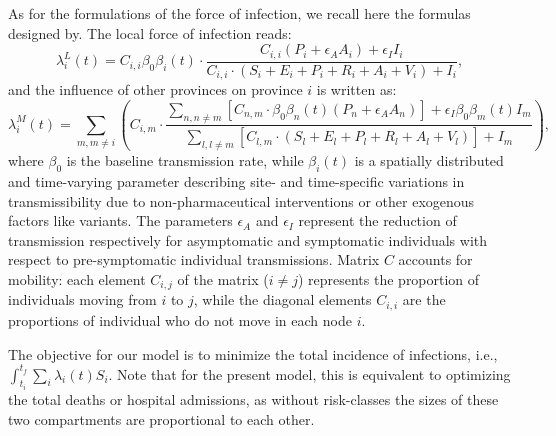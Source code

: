 As for the formulations of the force of infection, we recall here the formulas designed by\cite{Gatto:SpreadDynamicsCOVID19:2020,Bertuzzo:GeographyCOVID19Spread:2020}. The local force of infection reads:
\begin{equation} 
     \lambda^L_i(t) = C_{i,i} \beta_{0}  \beta_i(t) \cdot \frac{C_{i,i}  (P_i + \epsilon_A  A_i) + \epsilon_I  I_i}{C_{i,i} \cdot (S_i + E_i + P_i + R_i + A_i + V_i) + I_i}, \label{eq:foiL}
\end{equation}
and the influence of other provinces on province $i$ is written as:
\begin{equation}
     \lambda^M_i(t) = \sum_{m, m \neq i} \left( 
     C_{i,m} \cdot 
     \frac{
     \sum_{n, n \neq m} \left[ C_{n,m} \cdot \beta_{0}  \beta_n(t)  (P_n + \epsilon_A  A_n) \right] + \epsilon_I  \beta_{0}  \beta_m(t)  I_m
     }
     {
     \sum_{l, l \neq m}  \left[C_{l, m} \cdot (S_l + E_l + P_l + R_l + A_l + V_l) \right] + I_m
     } 
     \right), \label{eq:foiM}
\end{equation}
where $\beta_{0}$ is the baseline transmission rate, while $\beta_{i}(t)$ is a spatially distributed and time-varying parameter describing site- and time-specific variations in transmissibility due to non-pharmaceutical interventions or other exogenous factors like variants. The parameters $\epsilon_A$ and $\epsilon_I$ represent the reduction of transmission respectively for asymptomatic and symptomatic individuals with respect to pre-symptomatic individual transmissions. Matrix $C$ accounts for mobility: each element $C_{i,j}$ of the matrix ($i \neq j$) represents the proportion of individuals moving from $i$ to $j$, while the diagonal elements $C_{i,i}$ are the proportions of individual who do not move in each node $i$.

The objective for our model is to minimize the total incidence of infections, i.e., $\int_{t_i}^{t_f} \sum_i \lambda_i(t) S_i$. Note that for the present model, this is equivalent to optimizing the total deaths or hospital admissions, as without risk-classes the sizes of these two compartments are proportional to each other.

